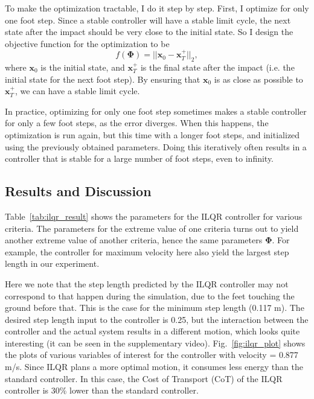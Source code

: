 To make the optimization tractable, I do it step by step. First, I optimize for only one foot step. Since a stable controller will have a stable limit cycle, the next state after the impact should be very close to the initial state. So I design the objective function for the optimization to be 
\begin{equation}
f(\bm{\Phi}) = ||\bm{x}_0 - \bm{x}_T^+ ||_2,
\end{equation}
where $\bm{x}_0$ is the initial state, and $\bm{x}_T^+$ is the final state after the impact (i.e. the initial state for the next foot step). By ensuring that $\bm{x}_0$ is as close as possible to $\bm{x}_T^+$, we can have a stable limit cycle. 

In practice, optimizing for only one foot step sometimes makes a stable controller for only a few foot steps, as the error diverges. When this happens, the optimization is run again, but this time with a longer foot steps, and initialized using the previously obtained parameters. Doing this iteratively often results in a controller that is stable for a large number of foot steps, even to infinity. 

\subsection{Results and Discussion}
\label{sec:results}

Table~\ref{tab:ilqr_result} shows the parameters for the ILQR controller for various criteria. The parameters for the extreme value of one criteria turns out to yield another extreme value of another criteria, hence the same parameters $\bm{\Phi}$. For example, the controller for maximum velocity here also yield the largest step length in our experiment. 

Here we note that the step length predicted by the ILQR controller may not correspond to that happen during the simulation, due to the feet touching the ground before that. This is the case for the minimum step length (0.117 m). The desired step length input to the controller is 0.25, but the interaction between the controller and the actual system results in a different motion, which looks quite interesting (it can be seen in the supplementary video). Fig.~\ref{fig:ilqr_plot} shows the plots of various variables of interest for the controller with velocity = 0.877 m/s. Since ILQR plans a more optimal motion, it consumes less energy than the standard controller. In this case, the Cost of Transport (CoT) of the ILQR controller is 30\% lower than the standard controller.

